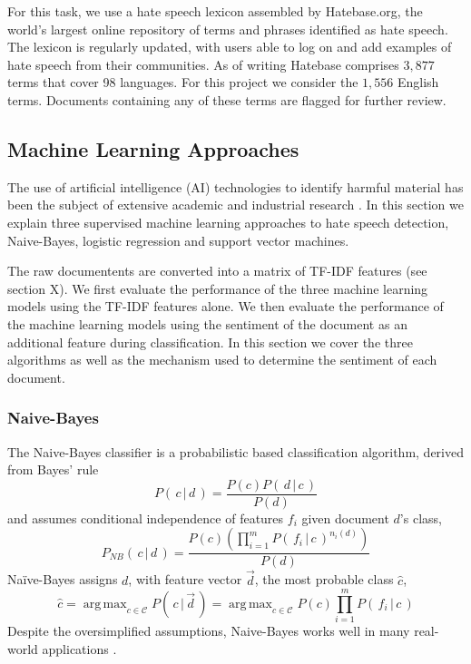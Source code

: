 \documentclass[a4paper,12pt]{report}
\DeclareMathOperator*{\argmax}{arg\,max}
\begin{document}
	For this task, we use a hate speech lexicon assembled by Hatebase.org, the world’s largest online repository of terms and phrases identified as hate speech. The lexicon is regularly updated, with users able to log on and add examples of hate speech from their communities. As of writing Hatebase comprises $3,877$ terms that cover 98 languages. For this project we consider the $1,556$ English terms. Documents containing any of these terms are flagged for further review.
	
	\subsection{Machine Learning Approaches}
	The use of artificial intelligence (AI) technologies to identify harmful material has been the subject of extensive academic and industrial research \cite{macavaney2019hate}. In this section we explain three supervised machine learning approaches to hate speech detection, Naive-Bayes, logistic regression and support vector machines. 
	
	The raw documentents are converted into a matrix of TF-IDF features (see section X). We first evaluate the performance of the three machine learning models using the TF-IDF features alone. We then evaluate the performance of the machine learning models using the sentiment of the document as an additional feature during classification. In this section we cover the three algorithms as well as the mechanism used to determine the sentiment of each document. 
	
	\subsubsection{Naive-Bayes}
	The Naive-Bayes classifier is a probabilistic based classification algorithm, derived from Bayes’ rule
	\[P( \, c \, | \, d \,)=\frac{P(c)P(\, d \, | \, c \,)}{P(d)}\]
	and assumes conditional independence of features \(f_i\) given document \(d\)'s class,
	\[P_{NB}(\, c \, | \, d \,)= \frac{P(c)
		(\prod_{i=1}^{m}P(\, f_i \, | \, c \,)^{n_i(d)})}	%
	{P(d)}\]												%
	Naïve-Bayes assigns \(d\), with feature vector \(\vec{d}\), the most probable class \(\hat{c}\),	
	\[ \hat{c} = \argmax_{c \in \mathcal{C}} P( \,c \, | \, \vec{d} \,)
	= \argmax_{c \in \mathcal{C}} P(c)\prod_{i=1}^{m} P( \, f_i \, | \, c \,)\]
	Despite the oversimplified assumptions, Naive-Bayes works well in many real-world applications \cite{rish2001empirical}. 
	
\end{document}
